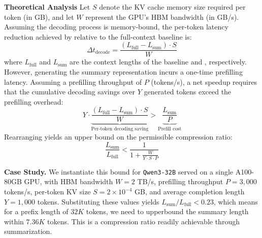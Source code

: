 \noindent \textbf{Theoretical Analysis}
Let $S$ denote the KV cache memory size required per token (in GB), and let $W$ represent the GPU's HBM bandwidth (in GB/s). Assuming the decoding process is memory-bound, the per-token latency reduction achieved by {\model} relative to the full-context baseline is:
\begin{equation}
\Delta t_{\text{decode}} = \frac{(L_{\text{full}} - L_{\text{sum}}) \cdot S}{W}
\end{equation}
where $L_{\text{full}}$ and $L_{\text{sum}}$ are the context lengths of the baseline and {\model}, respectively. However, generating the summary representation incurs a one-time prefilling latency. Assuming a prefilling throughput of $P$ (tokens/s), a net speedup requires that the cumulative decoding savings over $Y$ generated tokens exceed the prefilling overhead:
\begin{equation}
Y \cdot \underbrace{\frac{(L_{\text{full}} - L_{\text{sum}}) \cdot S}{W}}_{\text{Per-token decoding saving}} > \underbrace{\frac{L_{\text{sum}}}{P}}_{\text{Prefill cost}}
\end{equation}
Rearranging yields an upper bound on the permissible compression ratio:
\begin{equation}
\frac{L_{\text{sum}}}{L_{\text{full}}} < \frac{1}{1 + \frac{W}{Y \cdot S \cdot P}}
\end{equation}

\noindent \textbf{Case Study.} We instantiate this bound for \texttt{Qwen3-32B} served on a single A100-80GB GPU, with HBM bandwidth $W = 2$ TB/s, prefilling throughput $P = 3{,}000$ tokens/s, per-token KV size $S = 2 \times 10^{-4}$ GB, and average completion length $Y = 1{,}000$ tokens. Substituting these values yields $L_{\text{sum}} / L_{\text{full}} < 0.23$, which means for a prefix length of $32K$ tokens, we need to upperbound the summary length within $7.36K$ tokens. This is a compression ratio readily achievable through summarization.